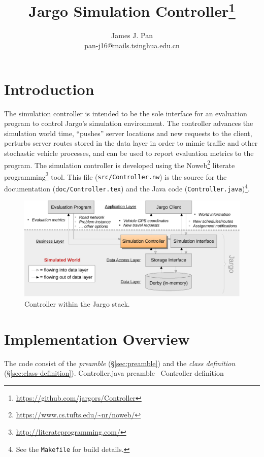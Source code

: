 \documentclass{article}
\title{Jargo Simulation Controller\footnote{
  \url{https://github.com/jargors/Controller}}}
\author{James J. Pan\\
  \small{\href{mailto:pan-j16@mails.tsinghua.edu.cn}{pan-j16@mails.tsinghua.edu.cn}}}
\def\nwendcode{\endtrivlist \endgroup}      %
\let\nwdocspar=\par
\begin{document}
\maketitle
\pagestyle{noweb}

\tableofcontents

\section{Introduction}
\label{sec:introduction}
The simulation controller is intended to be the sole interface for an
evaluation program to control Jargo's simulation environment. The controller
advances the simulation world time, ``pushes'' server locations and new
requests to the client, perturbs server routes stored in the data layer in
order to mimic traffic and other stochastic vehicle processes, and can be used
to report evaluation metrics to the program.  The simulation controller is
developed using the Noweb\footnote{\url{https://www.cs.tufts.edu/~nr/noweb/}}
literate programming\footnote{\url{http://literateprogramming.com/}} tool.
This file ({\tt{}src/Controller.nw}) is the source for the documentation
({\tt{}doc/Controller.tex}) and the Java code ({\tt{}Controller.java})\footnote{See
the {\tt{}Makefile} for build details.}.

\begin{figure}[h]
\centering
\includegraphics[width=150mm]{src/fig/controller-fig}
\caption{Controller within the Jargo stack.}
\label{fig:controller}
\end{figure}

\section{Implementation Overview}
The code consist of the \emph{preamble} (\S\ref{sec:preamble})
and the \emph{class definition} (\S\ref{sec:class-definition}).
\endmoddef{}
\LA{}Controller.java preamble~{\nwtagstyle{}}\RA{}
\LA{}\code{}Controller\edoc{} definition~{\nwtagstyle{}}\RA{}
\nwendcode{}\nwdocspar
\end{document}
